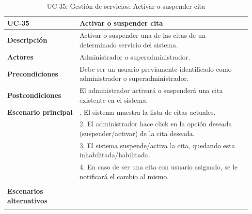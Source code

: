 \begin{table}[H]
  \begin{center}
    \begin{tabularx}{16.4cm}{|l|X|}
      \hline
      \textbf{UC-35} & \textbf{Activar o suspender cita}\\
      \hline
      \textbf{Descripción} & Activar o suspender una de las citas de un determinado servicio del sistema.\\
      \hline
      \textbf{Actores} & Administrador o superadministrador.\\
      \hline
      \textbf{Precondiciones} & Debe ser un usuario previamente identificado como administrador o superadministrador.\\
      \hline
      \textbf{Postcondiciones} & El administrador activará o suspenderá una cita existente en el sistema.\\
      \hline
      \textbf{Escenario principal} & \smallskip 1. El sistema muestra la lista de citas actuales.\\
      & 2. El administrador hace click en la opción deseada (suspender/activar) de la cita deseada.\\
      & 3. El sistema suspende/activa la cita, quedando esta inhabilitada/habilitada.\\
      & 4. En caso de ser una cita con usuario asignado, se le notificará el cambio al mismo.\\
      & \\
      \hline
      \textbf{Escenarios alternativos} & \smallskip \\
      & \\
      \hline
    \end{tabularx}
    \caption{UC-35: Gestión de servicios: Activar o suspender cita}
    \label{tab:CU-activar-suspender-cita}
  \end{center}
\end{table}


